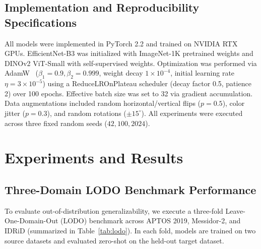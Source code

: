 \documentclass[conference]{IEEEtran}
\begin{document}
\subsection{Implementation and Reproducibility Specifications}
All models were implemented in PyTorch 2.2 and trained on NVIDIA RTX GPUs. EfficientNet-B3 was initialized with ImageNet-1K pretrained weights and DINOv2 ViT-Small with self-supervised weights. Optimization was performed via AdamW~\cite{loshchilov2018decoupled} ($\beta_1 = 0.9, \beta_2 = 0.999$, weight decay $1 \times 10^{-4}$, initial learning rate $\eta = 3 \times 10^{-5}$) using a ReduceLROnPlateau scheduler (decay factor 0.5, patience 2) over 100 epochs. Effective batch size was set to 32 via gradient accumulation. Data augmentations included random horizontal/vertical flips ($p=0.5$), color jitter ($p=0.3$), and random rotations ($\pm 15^\circ$). All experiments were executed across three fixed random seeds ($42, 100, 2024$).

\section{Experiments and Results}

\subsection{Three-Domain LODO Benchmark Performance}
To evaluate out-of-distribution generalizability, we execute a three-fold Leave-One-Domain-Out (LODO) benchmark across APTOS 2019, Messidor-2, and IDRiD (summarized in Table~\ref{tab:lodo}). In each fold, models are trained on two source datasets and evaluated zero-shot on the held-out target dataset.


\begin{table}[htbp]
    \centering
    \caption{Three-Fold LODO Held-Out Target-Domain Performance (QWK Score, Mean $\pm$ Std Dev across $N=3$ seeds)}
    \label{tab:lodo}
\end{table}
\end{document}
